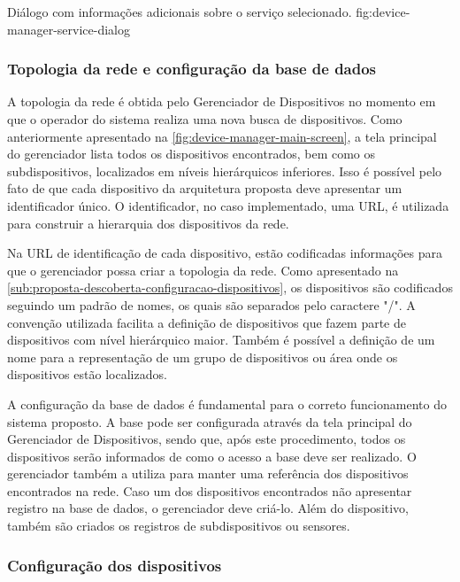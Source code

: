   {Diálogo com informações adicionais sobre o serviço selecionado.}
  {fig:device-manager-service-dialog}


\subsubsection{Topologia da rede e configuração da base de dados}

A topologia da rede é obtida pelo Gerenciador de Dispositivos no momento em que o operador do
sistema realiza uma nova busca de dispositivos. Como anteriormente apresentado na
\cref{fig:device-manager-main-screen}, a tela principal do gerenciador lista todos os dispositivos
encontrados, bem como os subdispositivos, localizados em níveis hierárquicos inferiores. Isso é
possível pelo fato de que cada dispositivo da arquitetura proposta deve apresentar um identificador
único. O identificador, no caso implementado, uma \gls{URL}, é utilizada para construir a hierarquia
dos dispositivos da rede.

Na \gls{URL} de identificação de cada dispositivo, estão codificadas informações para que o
gerenciador possa criar a topologia da rede. Como apresentado na
\cref{sub:proposta-descoberta-configuracao-dispositivos}, os dispositivos são codificados seguindo
um padrão de nomes, os quais são separados pelo caractere "/". A convenção utilizada facilita a
definição de dispositivos que fazem parte de dispositivos com nível hierárquico maior. Também é
possível a definição de um nome para a representação de um grupo de dispositivos ou área onde os
dispositivos estão localizados.

A configuração da base de dados é fundamental para o correto funcionamento do sistema proposto. A
base pode ser configurada através da tela principal do Gerenciador de Dispositivos, sendo que, após
este procedimento, todos os dispositivos serão informados de como o acesso a base deve ser
realizado. O gerenciador também a utiliza para manter uma referência dos dispositivos encontrados na
rede. Caso um dos dispositivos encontrados não apresentar registro na base de dados, o gerenciador
deve criá-lo. Além do dispositivo, também são criados os registros de subdispositivos ou sensores.


\subsubsection{Configuração dos dispositivos}

